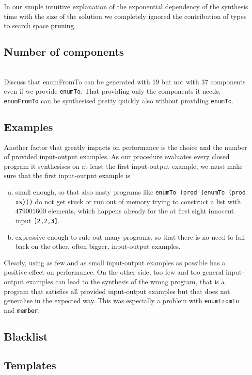 In our simple intuitive explanation of the exponential dependency of the synthesis time with the size of the solution we completely ignored the contribution of types to search space pruning.

\subsection{Number of components}
\\
Discuss that enumFromTo can be generated with 19 but not with 37 components even if we provide \lstinline?enumTo?. That providing only the components it needs, \lstinline?enumFromTo? can be synthesised pretty quickly also without providing \lstinline?enumTo?.


\subsection{Examples}
Another factor that greatly impacts on performance is the choice and the number of provided input-output examples. As our procedure evaluates every closed program it synthesises on at least the first input-output example, we must make sure that the first input-output example is
\begin{enumerate}[a.]
\item small enough, so that also nasty programs like \lstinline?enumTo (prod (enumTo (prod xs)))? do not get stuck or run out of memory trying to construct a list with $479001600$ elements, which happens already for the at first sight innocent input \lstinline?[2,2,3]?.
\item expressive enough to rule out many programs, so that there is no need to fall back on the other, often bigger, input-output examples.
\end{enumerate}
Clearly, using as few and as small input-output examples as possible has a positive effect on performance. On the other side, too few and too general input-output examples can lead to the synthesis of the wrong program, that is a program that satisfies all provided input-output examples but that does not generalise in the expected way. This was especially a problem with \lstinline?enumFromTo? and \lstinline?member?.

\subsection{Blacklist}
\subsection{Templates}
